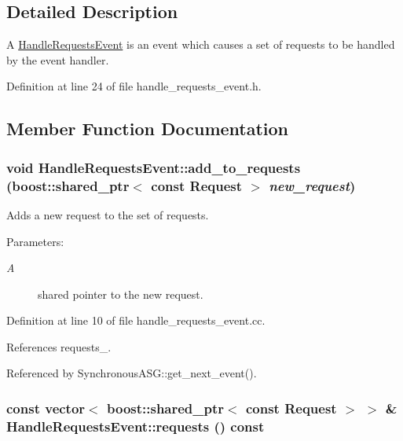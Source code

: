 \subsection{Detailed Description}
A \hyperlink{class_handle_requests_event}{HandleRequestsEvent} is an event which causes a set of requests to be handled by the event handler. 

Definition at line 24 of file handle\_\-requests\_\-event.h.

\subsection{Member Function Documentation}
\hypertarget{class_handle_requests_event_9d8db560c776cba3f19050f8a0b58ce3}{
\subsubsection[add\_\-to\_\-requests]{\setlength{\rightskip}{0pt plus 5cm}void HandleRequestsEvent::add\_\-to\_\-requests (boost::shared\_\-ptr$<$ const {\bf Request} $>$ {\em new\_\-request})}}
\label{class_handle_requests_event_9d8db560c776cba3f19050f8a0b58ce3}


Adds a new request to the set of requests. \begin{Desc}
\item[Parameters:]
\begin{description}
\item[{\em A}]shared pointer to the new request. \end{description}
\end{Desc}


Definition at line 10 of file handle\_\-requests\_\-event.cc.

References requests\_\-.

Referenced by SynchronousASG::get\_\-next\_\-event().\hypertarget{class_handle_requests_event_a03318f80549212e2023cdab01c9f924}{
\subsubsection[requests]{\setlength{\rightskip}{0pt plus 5cm}const vector$<$ boost::shared\_\-ptr$<$ const {\bf Request} $>$ $>$ \& HandleRequestsEvent::requests () const}}
\label{class_handle_requests_event_a03318f80549212e2023cdab01c9f924}


